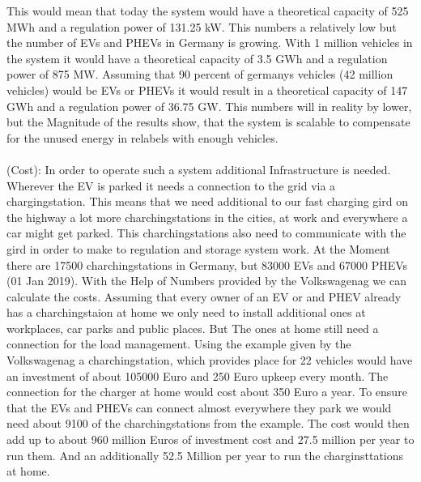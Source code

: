 \documentclass[12pt,a4paper]{article}
\begin{document}
\begin{parcolumns}[colwidths={1=2.5 cm, 2=10 cm, 3=2.5cm}]{3}
{%
This would mean that today the system would have a theoretical capacity of 525 MWh and a regulation power of 131.25 kW. This numbers a relatively low but the number of EVs and PHEVs in Germany is growing. With 1 million vehicles in the system it would have a theoretical capacity of 3.5 GWh and a regulation power of 875 MW. Assuming that 90 percent of germanys vehicles (42 million vehicles) would be EVs or PHEVs it would result in a theoretical capacity of 147 GWh and a regulation power of 36.75 GW. This numbers will in reality by lower, but the Magnitude of the results show, that the system is scalable to compensate for the unused energy in relabels with enough vehicles.
\\ \\
\noindent
(Cost): In order to operate such a system additional Infrastructure is needed. Wherever the EV is parked it needs a connection to the grid via a chargingstation. This means that we need additional to our fast charging gird on the highway a lot more charchingstations in the cities, at work and everywhere a car might get parked. This charchingstations also need to communicate with the gird in order to make to regulation and storage system work.
At the Moment there are 17500 charchingstations in Germany, but 83000 EVs and 67000 PHEVs (01 Jan 2019).
With the Help of Numbers provided by the Volkswagenag we can calculate the costs. Assuming that every owner of an EV or and PHEV already has a charchingstaion at home we only need to install additional ones at workplaces, car parks and public places. But The ones at home still need a connection for the load management. Using the example given by the Volkswagenag a charchingstation, which provides place for 22 vehicles would have an investment of about 105000 Euro and 250 Euro upkeep every month. The connection for the charger at home would cost about 350 Euro a year.
To ensure that the EVs and PHEVs can connect almost everywhere they park we would need about 9100 of the charchingstations from the example.
The cost would then add up to about 960 million Euros of investment cost and 27.5 million per year to run them. And an additionally 52.5 Million per year to run the charginsttations at home.
}
\end{parcolumns}
\end{document}
